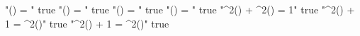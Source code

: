 "\sin(\alpha) = " true
"\cos(\alpha) = " true
"\tan(\alpha) = " true
"\cotan(\alpha) = " true
"\sin^2(\alpha) + \cos^2(\alpha) = 1" true
"\tan^2(\alpha) + 1 = \sec^2(\alpha)" true
"\cot^2(\alpha) + 1 = \csc^2(\alpha)" true
